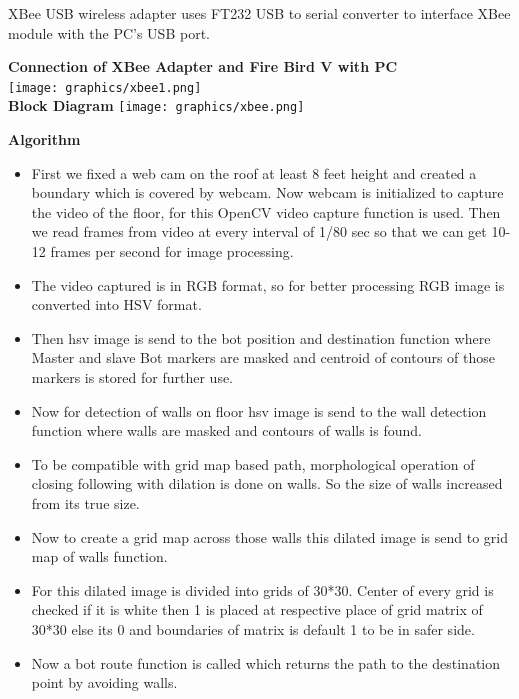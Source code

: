 \documentclass[report]{res}
\begin{document}
	\pagebreak
	XBee USB wireless adapter uses FT232 USB to serial converter to interface XBee module	with the PC’s USB port.
	
	\textbf{\large Connection of XBee Adapter and Fire Bird V with PC} \\
	
	\texttt{[image: graphics/xbee1.png]}\\
	
	\textbf{\large Block Diagram}
	\texttt{[image: graphics/xbee.png]}\\
	
	\pagebreak
	\begin{center}
		\textbf{\huge Algorithm} \\
	\end{center}
	
	
	\begin{itemize}
		\item First we fixed a web cam on the roof at least 8 feet height and created a boundary which is covered by webcam. Now webcam is initialized to capture the video of the floor, for this OpenCV video capture function is used. Then we read frames from video at every interval of 1/80 sec so that we can get 10-12 frames per second for image processing. 
		\item The video captured is in RGB format, so for better processing RGB image is converted into HSV format.
		\item Then hsv image is send to the bot position and destination function where Master and slave Bot markers are masked and centroid of contours of those markers is stored for further use. 
		\item Now for detection of walls on floor hsv image is send to the wall detection function where walls are masked and contours of walls is found. 
		\item To be compatible with grid map based path, morphological operation of closing following with dilation is done on walls. So the size of walls increased from its true size. 
		\item Now to create a grid map across those walls this dilated image is send to grid map of walls function. 
		\item For this dilated image is divided into grids of 30*30. Center of every grid is checked if it is white then 1 is placed at respective place of grid matrix of 30*30 else its 0 and boundaries of matrix is default 1 to be in safer side. 
		\item Now a bot route function is called which returns the path to the destination point by avoiding walls. 

\end{itemize}
\end{document}
